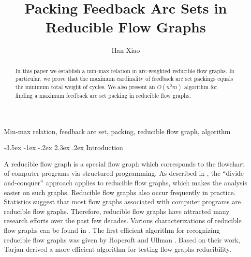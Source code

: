 \documentclass[11pt]{article}
\title{\bf Packing Feedback Arc Sets in Reducible Flow Graphs}
\author{Han Xiao}
\affil{Department of Mathematics, The University of Hong Kong,

Hong Kong, China

{\tt hxiao.math@connect.hku.hk}}
\makeatletter
\renewcommand\section{%
  \@startsection{section}{1}
                {\z@}%
                {-3.5ex \@plus -1ex \@minus -.2ex}%
                {2.3ex \@plus.2ex}%
                {\large\bfseries}%
}
\makeatother
\begin{document}
 \date{}
\maketitle

\begin{abstract}
In this paper we establish a min-max relation in arc-weighted reducible flow graphs. In particular, we prove that the maximum cardinality of feedback arc set packings equals the minimum total weight of cycles.  We also present an $O(n^2 m)$ algorithm for finding a maximum feedback arc set packing in reducible flow graphs.
\end{abstract}

\quad Min-max relation, feedback arc set, packing, reducible flow graph, algorithm


\jot


\section{Introduction}
\label{intro}

A reducible flow graph is a special flow graph which corresponds to the flowchart of computer programs via structured programming. As described in \cite{Hech}, the ``divide-and-conquer'' approach applies to reducible flow graphs, which makes the analysis easier on such graphs. Reducible flow graphs also occur frequently in practice. Statistics suggest that most flow graphs associated with computer programs are reducible flow graphs. Therefore, reducible flow graphs have attracted many research efforts over the past few decades. Various characterizations of reducible flow graphs can be found in \cite{HecU1}. The first efficient algorithm for recognizing reducible flow graphs was given by Hopcroft and Ullman \cite{HopU}. Based on their work, Tarjan \cite{Tarj} derived a more efficient algorithm for testing flow graphs reducibility. 
\end{document}
